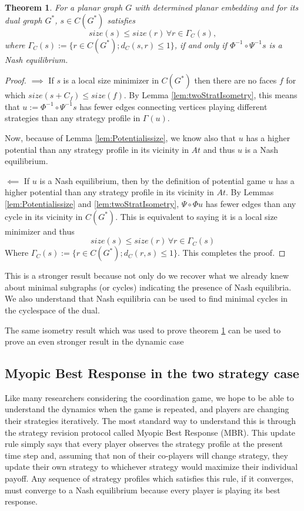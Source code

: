 \documentclass{article}
\newtheorem{theorem}{Theorem}[section]
\DeclareMathOperator{\At}{\mathcal{A}_{G}^{(2)}}
\begin{document}
    \begin{theorem}\label{thm:2stratMinimalSubgraphs}
        For a planar graph $G$ with determined planar embedding and for its dual graph $G^*$, $s\in C(G^*)$ satisfies 
        \[size(s)\leq size(r)\, \forall r\in \Gamma_C(s), \]
        where $\Gamma_C(s):=\{r\in C(G^*);d_C(s,r)\leq 1\} $, if and only if $\Phi^{-1}\circ\Psi^{-1}s$ is a Nash equilibrium. 
    \end{theorem}

    \begin{proof}
         $\implies$ If $s$ is a local size minimizer in $C(G^*)$ then there are no faces $f$ for which $size(s+C_f)\leq size(f)$. By Lemma \ref{lem:twoStratIsometry}, this means that $u:=\Phi^{-1}\circ\Psi^{-1}s$ has fewer edges connecting vertices playing different strategies than any strategy profile in $\Gamma_{\At}(u).$

         Now, because of Lemma \ref{lem:Potentialissize}, we know also that $u$ has a higher potential than any strategy profile in its vicinity in $At$ and thus $u$ is a Nash equilibrium. 

        $\impliedby$ If $u$ is a Nash equilibrium, then by the definition of potential game $u$ has a higher potential than any strategy profile in its vicinity in $At$. By Lemmas \ref{lem:Potentialissize} and \ref{lem:twoStratIsometry}, $\Psi \circ \Phi u$ has fewer edges than any cycle in its vicinity in $C(G^*)$. This is equivalent to saying it is a local size minimizer and thus
        \[size(s)\leq size(r)\, \forall r\in \Gamma_C(s)\]
         Where $\Gamma_C(s):=\{r\in C(G^*);d_C(r,s)\leq 1\}$. This completes the proof.  
    \end{proof}

    This is a stronger result because not only do we recover what we already knew about minimal subgraphs (or cycles) indicating the presence of Nash equilibria. We also understand that Nash equilibria can be used to find minimal cycles in the cyclespace of the dual.

    The same isometry result which was used to prove theorem \ref{thm:2stratMinimalSubgraphs} can be used to prove an even stronger result in the dynamic case
    
    \subsection{Myopic Best Response in the two strategy case}
    Like many researchers considering the coordination game, we hope to be able to understand the dynamics when the game is repeated, and players are changing their strategies iteratively. The most standard way to understand this is through the strategy revision protocol called Myopic Best Response (MBR). This update rule simply says that every player observes the strategy profile at the present time step and, assuming that non of their co-players will change strategy, they update their own strategy to whichever strategy would maximize their individual payoff. Any sequence of strategy profiles which satisfies this rule, if it converges, must converge to a Nash equilibrium because every player is playing its best response.
\end{document}
